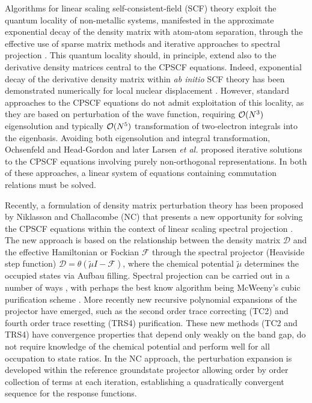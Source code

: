 \documentclass[prl,aps,twocolumn,showpacs,twocolumngrid,superbib]{revtex4}
\begin{document}
Algorithms for linear scaling self-consistent-field (SCF) theory exploit the quantum locality
of non-metallic systems, manifested in the approximate exponential decay of the density matrix 
with atom-atom separation, through the effective use of sparse matrix methods and iterative 
approaches to spectral projection \cite{ANiklasson02A,ANiklasson03}.   This quantum locality should, 
in principle, extend also to the derivative density matrices central to the CPSCF equations.  Indeed,  
exponential decay of the derivative density matrix within {\em ab initio} SCF theory has been demonstrated 
numerically for local nuclear displacement \cite{Ochsenfeld_1997}. However, standard approaches to the CPSCF equations 
\cite{Pople_1979,Sekino_1986,Dupuis_1991} do not admit exploitation of this locality, as they are based 
on perturbation of the wave function, requiring ${\cal O}(N^3)$ eigensolution and typically ${\cal O}(N^5)$ 
transformation of two-electron integrals into the eigenbasis.   Avoiding both 
eigensolution and integral transformation,  Ochsenfeld and Head-Gordon \cite{Ochsenfeld_1997} and
later Larsen {\em et al.} \cite{Helgaker_2001} proposed iterative solutions to the CPSCF equations 
involving purely non-orthogonal representations.   In both of these approaches, a 
linear system of equations containing commutation relations must be solved.

Recently, a formulation of density matrix perturbation theory has been proposed 
by Niklasson and Challacombe (NC) \cite{ANiklasson04} that presents a new opportunity for solving 
the CPSCF equations within the context of linear scaling spectral projection \cite{ANiklasson02A,ANiklasson03}.  
The new approach is based on the relationship between the density matrix $\mathcal{D}$ and the effective Hamiltonian 
or Fockian $\mathcal{F}$ through the spectral projector (Heaviside step function) $\mathcal{D}=\theta(\tilde{\mu}I-\mathcal{F})$, 
where the chemical potential $\tilde{\mu}$ determines the occupied states via Aufbau filling.   
Spectral projection can be carried out in a number of ways 
\cite{ANiklasson02A,ANiklasson03,RMcWeeny60,WClinton69,APalser98,GBeylkin99,KNemeth00,AHolas01}, 
with perhaps the best know algorithm being McWeeny's cubic purification scheme \cite{RMcWeeny60}. 
More recently new recursive polynomial expansions of the projector have emerged, 
such as the second order trace correcting (TC2) \cite{ANiklasson02A} and fourth order trace resetting 
(TRS4) \cite{ANiklasson03} purification.  These new methods (TC2 and TRS4) have convergence properties 
that depend only weakly on the band gap, do not require knowledge of the chemical potential
and perform well for all occupation to state ratios. In the NC approach, 
the perturbation expansion is developed within the reference groundstate projector allowing 
order by order collection of terms at each iteration, establishing a quadratically convergent 
sequence for the response functions.  
\end{document}
